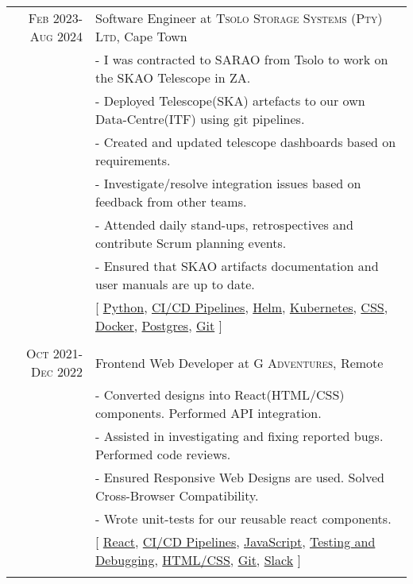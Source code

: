 \documentclass[a4paper,10pt]{article} %
\begin{document}
\begin{tabular}{r|p{15cm}}
\textsc{Feb 2023-Aug 2024} & Software Engineer at \textsc{Tsolo Storage Systems (Pty) Ltd}, Cape Town \emph{}\\
& \footnotesize{- I was contracted to SARAO from Tsolo to work on the SKAO Telescope in ZA.}\\
& \footnotesize{- Deployed Telescope(SKA) artefacts to our own Data-Centre(ITF) using git pipelines.}\\
& \footnotesize{- Created and updated telescope dashboards based on requirements.}\\
& \footnotesize{- Investigate/resolve integration issues based on feedback from other teams.}\\
& \footnotesize{- Attended daily stand-ups, retrospectives and contribute Scrum planning events.}\\
& \footnotesize{- Ensured that SKAO artifacts documentation and user manuals are up to date.}\\
& \footnotesize{[ \href{https://www.python.org/}{Python}, \href{https://github.com/solutions/ci-cd}{CI/CD Pipelines}, \href{https://helm.sh/}{Helm}, \href{https://kubernetes.io/}{Kubernetes}, \href{https://datatracker.ietf.org/doc/html/rfc7993}{CSS}, \href{https://www.docker.com/}{Docker}, \href{https://www.postgresql.org/}{Postgres}, \href{https://git-scm.com/}{Git}   ]}\\
\multicolumn{2}{c}{} \\


\textsc{Oct 2021-Dec 2022} & Frontend Web Developer at \textsc{G Adventures}, Remote \emph{}\\
& \footnotesize{- Converted designs into React(HTML/CSS) components. Performed API integration.}\\
& \footnotesize{- Assisted in investigating and fixing reported bugs. Performed code reviews.}\\
& \footnotesize{- Ensured Responsive Web Designs are used. Solved Cross-Browser Compatibility.}\\
& \footnotesize{- Wrote unit-tests for our reusable react components.}\\
& \footnotesize{[ \href{https://react.dev/}{React}, \href{https://github.com/solutions/ci-cd}{CI/CD Pipelines}, \href{https://developer.mozilla.org/en-US/docs/Web/JavaScript}{JavaScript}, \href{https://jestjs.io/}{Testing and Debugging}, \href{https://datatracker.ietf.org/doc/html/rfc7993}{HTML/CSS}, \href{https://git-scm.com/}{Git}, \href{https://slack.com/}{Slack} ]}\\
\multicolumn{2}{c}{} \\


\end{tabular}
\end{document}
